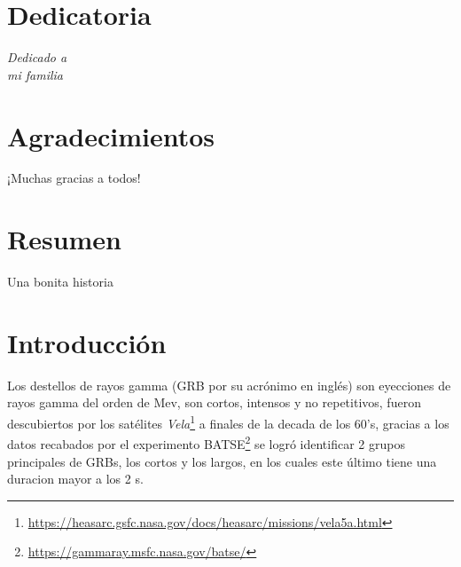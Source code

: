 \documentclass[12pt,a4paper]{book}
\begin{document}
\chapter*{Dedicatoria}

%
\begin{flushright}
\textit{Dedicado a \\
mi familia}
\end{flushright}

%
\chapter*{Agradecimientos} %
 
¡Muchas gracias a todos!

\chapter*{Resumen} %

%
Una bonita historia
%
%
%

\chapter{Introducción}


Los destellos de rayos gamma (GRB por su acrónimo en inglés) son eyecciones de rayos gamma del orden de Mev, son cortos, intensos y no repetitivos, fueron descubiertos por los satélites \emph{Vela}\footnote{\url{https://heasarc.gsfc.nasa.gov/docs/heasarc/missions/vela5a.html}} a finales de la decada de los 60's, gracias a los datos recabados por el experimento BATSE\footnote{\url{https://gammaray.msfc.nasa.gov/batse/}} se logró identificar 2 grupos principales de GRBs, los cortos y los largos, en los cuales este último tiene una duracion mayor a los 2 s.
\end{document}

